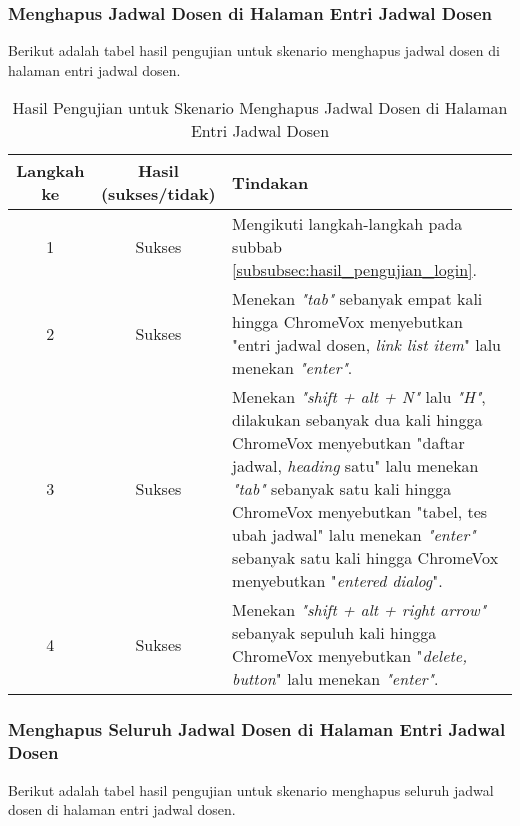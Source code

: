 \subsubsection{Menghapus Jadwal Dosen di Halaman Entri Jadwal Dosen}
\label{subsubsec:hasil_pengujian_menghapus_jadwal_dosen_di_halaman_entri_jadwal_dosen}
Berikut adalah tabel hasil pengujian untuk skenario menghapus jadwal dosen di halaman entri jadwal dosen.

\begin{table}[H]
    \centering 
    \caption{Hasil Pengujian untuk Skenario Menghapus Jadwal Dosen di Halaman Entri Jadwal Dosen}
    \label{tab:hasil_pengujian_menghapus_jadwal_dosen_di_halaman_entri_jadwal_dosen}
    \begin{tabular}{|c|c|p{10cm}|}
        \toprule
        Langkah ke & Hasil (sukses/tidak) & Tindakan \\

        \midrule
        1 & Sukses & Mengikuti langkah-langkah pada subbab \ref{subsubsec:hasil_pengujian_login}. \\
        2 & Sukses & Menekan \textit{"tab"} sebanyak empat kali hingga ChromeVox menyebutkan "entri jadwal dosen, \textit{link list item}" lalu menekan \textit{"enter"}. \\
        3 & Sukses & Menekan \textit{"shift + alt + N"} lalu \textit{"H"}, dilakukan sebanyak dua kali hingga ChromeVox menyebutkan "daftar jadwal, \textit{heading} satu" lalu menekan \textit{"tab"} sebanyak satu kali hingga ChromeVox menyebutkan "tabel, tes ubah jadwal" lalu menekan \textit{"enter"} sebanyak satu kali hingga ChromeVox menyebutkan "\textit{entered dialog}". \\
        4 & Sukses & Menekan \textit{"shift + alt + right arrow"} sebanyak sepuluh kali hingga ChromeVox menyebutkan "\textit{delete, button}" lalu menekan \textit{"enter"}. \\

        \bottomrule

    \end{tabular}
\end{table}

\subsubsection{Menghapus Seluruh Jadwal Dosen di Halaman Entri Jadwal Dosen}
\label{subsubsec:hasil_pengujian_menghapus_seluruh_jadwal_dosen_di_halaman_entri_jadwal_dosen}
Berikut adalah tabel hasil pengujian untuk skenario menghapus seluruh jadwal dosen di halaman entri jadwal dosen.

